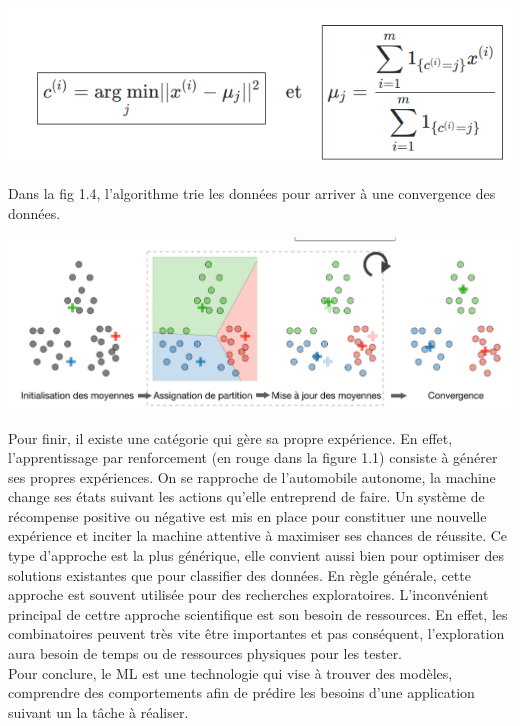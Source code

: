 \documentclass[12pt,a4paper,french]{report}
\begin{document}
\begin{center}
	\includegraphics[scale=0.5]{algo_k_means}
	\label{fig1}
\end{center}
\pagebreak
Dans la fig 1.4, l'algorithme trie les données pour arriver à une convergence des données.

\begin{center}
	\includegraphics[scale=0.4]{k_means}
	\label{fig1}
\end{center}

Pour finir, il existe une catégorie qui gère sa propre expérience. En effet, l'apprentissage par renforcement (en rouge dans la figure 1.1) consiste à générer ses propres expériences. On se rapproche de l'automobile autonome, la machine change ses états suivant les actions qu'elle entreprend de faire. Un système de récompense positive ou négative est mis en place pour constituer une nouvelle expérience et inciter la machine attentive à maximiser ses chances de réussite. Ce type d'approche est la plus générique, elle convient aussi bien pour optimiser des solutions existantes que pour classifier des données. En règle générale, cette approche est souvent utilisée pour des recherches exploratoires. L'inconvénient principal de cettre approche scientifique est son besoin de ressources. En effet, les combinatoires peuvent très vite être importantes et pas conséquent, l'exploration aura besoin de temps ou de ressources physiques pour les tester.\\

Pour conclure, le ML est une technologie qui vise à trouver des modèles, comprendre des comportements afin de prédire les besoins d'une application suivant un la tâche à réaliser.\\
\end{document}
